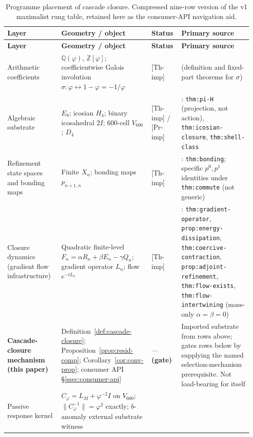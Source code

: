 \documentclass[11pt]{article}
\theoremstyle{definition}
\newcommand{\Q}{\mathbb{Q}}
\newcommand{\Z}{\mathbb{Z}}
\newcommand{\pphi}{\varphi}
\newcommand{\Vsub}{V_{600}}
\newcommand{\Cphi}{C_{\pphi}}
\begin{document}
\renewcommand{\arraystretch}{1.20}
\begin{longtable}{>{\raggedright\arraybackslash}p{}>{\raggedright\arraybackslash}p{}>{\raggedright\arraybackslash}p{}>{\raggedright\arraybackslash}p{}}
\caption{Programme placement of cascade closure. Compressed
nine-row version of the v1 maximalist rung table, retained here as
the consumer-API navigation aid.}\label{tab:rung-placement}\\
\toprule
\textbf{Layer} & \textbf{Geometry / object} & \textbf{Status} & \textbf{Primary source} \\
\midrule
\endfirsthead
\toprule
\textbf{Layer} & \textbf{Geometry / object} & \textbf{Status} & \textbf{Primary source} \\
\midrule
\endhead
Arithmetic coefficients
& $\Q(\pphi)$, $\Z[\pphi]$; coefficientwise Galois involution $\sigma : \pphi \leftrightarrow 1 - \pphi = -1/\pphi$
& \textsf{[Th-imp]}
& \cite{CascadeSigmaRat} (definition and fixed-part theorems for $\sigma$) \\
Algebraic substrate
& $E_8$; icosian $H_4$; binary icosahedral $2I$; 600-cell $\Vsub$; $D_4$
& \textsf{[Th-imp]} / \textsf{[Pr-imp]}
& \cite{CascadeAlgSubstrate}: \texttt{thm:pi-H} (projection, not action), \texttt{thm:icosian-closure}, \texttt{thm:shell-class} \\
Refinement state spaces and bonding maps
& Finite $X_n$; bonding maps $p_{n+1, n}$
& \textsf{[Th-imp]}
& \cite{CascadeRefinementSpaces}: \texttt{thm:bonding}; specific $p^0, p^1$ identities under \texttt{thm:commute} (not generic) \\
Closure dynamics (gradient flow infrastructure)
& Quadratic finite-level $F_n = \alpha R_n + \beta E_n - \gamma Q_n$; gradient operator $L_n$; flow $e^{-tL_n}$
& \textsf{[Th-imp]}
& \cite{CascadeClosureDynamics}: \texttt{thm:gradient-operator}, \texttt{prop:energy-dissipation}, \texttt{thm:coercive-contraction}, \texttt{prop:adjoint-refinement}, \texttt{thm:flow-exists}, \texttt{thm:flow-intertwining} (mass-only $\alpha = \beta = 0$) \\
\textbf{Cascade-closure mechanism (this paper)}
& Definition~\ref{def:cascade-closure}; Proposition~\ref{prop:resid-comp}; Corollary~\ref{cor:conv-prop}; consumer API \S\ref{ssec:consumer-api}
& --- \textbf{(gate)}
& Imported substrate from rows above; gates rows below by supplying the named selection-mechanism prerequisite. Not load-bearing for itself \\
Passive response kernel
& $\Cphi = L_M + \pphi^{-2} I$ on $\Vsub$; $\|\Cphi^{-1}\| = \pphi^2$ exactly; $b$-anomaly external substrate witness

\end{longtable}
\end{document}
